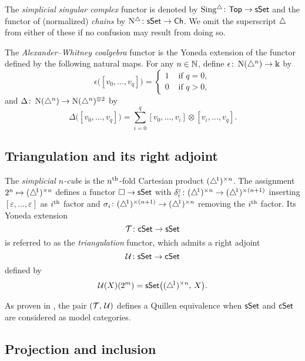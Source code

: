 The \textit{simplicial singular complex} functor is denoted by $\operatorname{Sing^{\triangle}} \colon \mathsf{Top} \to \mathsf{sSet}$ and the functor of (normalized) \textit{chains} by $\operatorname{N^{\triangle}} \colon \mathsf{sSet} \to \mathsf{Ch}$.
We omit the superscript $\triangle$ from either of these if no confusion may result from doing so.

The \textit{Alexander--Whitney coalgebra} functor is the Yoneda extension of the functor defined by the following natural maps.
For any $n \in \mathbb{N}$, define $\epsilon \colon \operatorname{N}(\triangle^n) \to \Bbbk$ by
\[
\epsilon \big( [v_0, \dots, v_q] \big) = \begin{cases} 1 & \text{ if } q = 0, \\ 0 & \text{ if } q>0, \end{cases}
\]
and $\Delta \colon \operatorname{N}(\triangle^n) \to \operatorname{N}(\triangle^n)^{\otimes2}$ by
\[
\Delta \big( [v_0, \dots, v_q] \big) = \sum_{i=0}^q [v_0, \dots, v_i] \otimes [v_i, \dots, v_q].
\]




\subsection{Triangulation and its right adjoint}

The \textit{simplicial $n$-cube} is the $n^{\mathrm{th}}$-fold Cartesian product $(\triangle^{\!1})^{\times n}$.
The assignment $2^n \mapsto (\triangle^{\!1})^{\times n}$ defines a functor $\square \to \mathsf{sSet}$ with $\delta_i^\varepsilon \colon (\triangle^{\!1})^{\times n} \to (\triangle^{\!1})^{\times (n+1)}$ inserting $[\varepsilon, \dots, \varepsilon]$ as $i^{\mathrm{th}}$ factor and $\sigma_i \colon (\triangle^{\!1})^{\times (n+1)} \to (\triangle^{\!1})^{\times n}$ removing the $i^{\mathrm{th}}$ factor.
Its Yoneda extension
\[
\operatorname{\mathcal{T}} \colon \mathsf{cSet} \to \mathsf{sSet}
\]
is referred to as the \textit{triangulation} functor, which admits a right adjoint
\[
\operatorname{\mathcal{U}} \colon \mathsf{sSet} \to \mathsf{cSet}
\]
defined by
\[
\operatorname{\mathcal{U}}(X)(2^m) = \mathsf{sSet} \big( (\triangle^{\!1})^{\times n}, \, X \big).
\]

As proven in \cite[.30]{cisinski2006presheaves}, the pair $(\operatorname{\mathcal{T}},\, \operatorname{\mathcal{U}})$ defines a Quillen equivalence when $\mathsf{sSet}$ and $\mathsf{cSet}$ are considered as model categories.

\subsection{Projection and inclusion} \label{ss:projection and inclusion}

